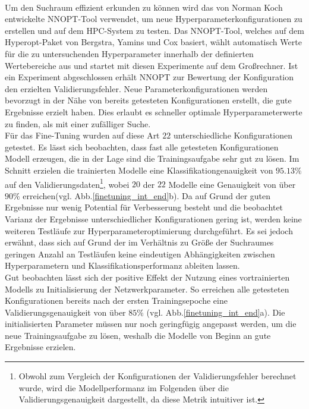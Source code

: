 \\
Um den Suchraum effizient erkunden zu können wird das von Norman Koch entwickelte NNOPT-Tool verwendet, um neue Hyperparameterkonfigurationen zu erstellen und auf dem HPC-System zu testen. Das NNOPT-Tool, welches auf dem Hyperopt-Paket \cite{hyperopt} von Bergstra, Yamins und Cox basiert, wählt automatisch Werte für die zu untersuchenden Hyperparameter innerhalb der definierten Wertebereiche aus und startet mit diesen Experimente auf dem Großrechner. Ist ein Experiment abgeschlossen erhält NNOPT zur Bewertung der Konfiguration den erzielten Validierungsfehler. Neue Parameterkonfigurationen werden bevorzugt in der Nähe von bereits getesteten Konfigurationen erstellt, die gute Ergebnisse erzielt haben. Dies erlaubt es schneller optimale Hyperparameterwerte zu finden, als mit einer zufälliger Suche.
\\
Für das Fine-Tuning wurden auf diese Art $22$ unterschiedliche Konfigurationen getestet. Es lässt sich beobachten, dass fast alle getesteten Konfigurationen Modell erzeugen, die in der Lage sind die Trainingsaufgabe sehr gut zu lösen. Im Schnitt erzielen die trainierten Modelle eine Klassifikationgenauigkeit von $95.13\%$ auf den Validierungsdaten\footnote{Obwohl zum Vergleich der Konfigurationen der Validierungsfehler berechnet wurde, wird die Modellperformanz im Folgenden über die Validierungsgenauigkeit dargestellt, da diese Metrik intuitiver ist.}, wobei $20$ der $22$ Modelle eine Genauigkeit von über $90\%$ erreichen(vgl. Abb.\ref{finetuning_int_end}b). Da auf Grund der guten Ergebnisse nur wenig Potential für Verbesserung besteht und die beobachtet Varianz der Ergebnisse unterschiedlicher Konfigurationen gering ist, werden keine weiteren Testläufe zur Hyperparameteroptimierung durchgeführt. Es sei jedoch erwähnt, dass sich auf Grund der im Verhältnis zu Größe der Suchraumes geringen Anzahl an Testläufen keine eindeutigen Abhängigkeiten zwischen Hyperparametern und Klassifikationsperformanz ableiten lassen.
\\
Gut beobachten lässt sich der positive Effekt der Nutzung eines vortrainierten Modells zu Initialisierung der Netzwerkparameter. So erreichen alle getesteten Konfigurationen bereits nach der ersten Trainingsepoche eine Validierungsgenauigkeit von über $85\%$ (vgl. Abb.\ref{finetuning_int_end}a). Die initialisierten Parameter müssen nur noch geringfügig angepasst werden, um die neue Trainingsaufgabe zu lösen, weshalb die Modelle von Beginn an gute Ergebnisse erzielen. 
\\
